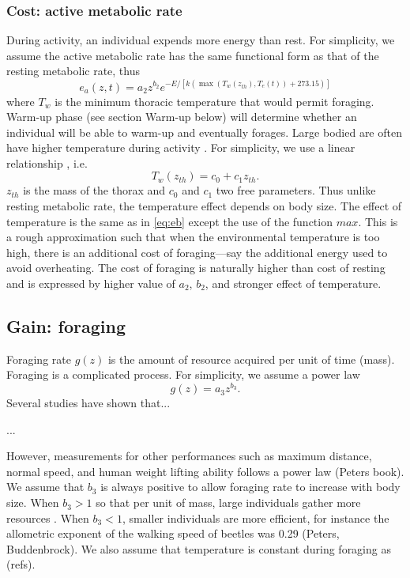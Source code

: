 \subsubsection*{Cost: active metabolic rate}
During activity, an individual expends more energy than rest. 
For simplicity, we assume the active metabolic rate has the same functional form as that of the resting metabolic rate, thus
\begin{equation} \label{eq:ea}
	e_a(z,t) = a_2 z^{b_2}  e^{-E/[k (\max(T_w(z_{th}), T_e(t))+ 273.15)]}
\end{equation}
where $T_w$ is the minimum thoracic temperature that would permit foraging.
Warm-up phase (see section Warm-up below) will determine whether an individual will be able to warm-up and eventually forages.
Large bodied are often have higher temperature during activity \citep{Bartholomew1977a}.
For simplicity, we use a linear relationship \citep{Bartholomew1977a}, i.e.
\begin{equation} \label{eq:Tw}
	T_w(z_{th}) = c_0+ c_1 z_{th}.
\end{equation}
$z_{th}$ is the mass of the thorax and $c_0$ and $c_1$ two free parameters.
Thus unlike resting metabolic rate, the temperature effect depends on body size.
The effect of temperature is the same as in \cref{eq:eb} except the use of the function $max$.
This is a rough approximation such that when the environmental temperature is too high, there is an additional cost of foraging---say the additional energy used to avoid overheating. 
The cost of foraging is naturally higher than cost of resting and is expressed by higher value of $a_2$, $b_2$, and stronger effect of temperature.

\subsection*{Gain: foraging}
Foraging rate $g(z)$ is the amount of resource acquired per unit of time (mass).
Foraging is a complicated process.
For simplicity, we assume a power law 
\[
	g(z) = a_3 z^{b_3}.
\] 
Several studies have shown that...

...

However, measurements for other performances such as maximum distance, normal speed, and human weight lifting ability follows a power law (Peters book). 
We assume that $b_3$ is always positive to allow foraging rate to increase with body size.
When $b_3 > 1$ so that per unit of mass, large individuals gather more resources \citep[e.g.,][]{Nervo2014}.
When $b_3 < 1$, smaller individuals are more efficient, for instance the allometric exponent of the walking speed of beetles was 0.29 (Peters, Buddenbrock). 
We also assume that temperature is constant during foraging as (refs).

